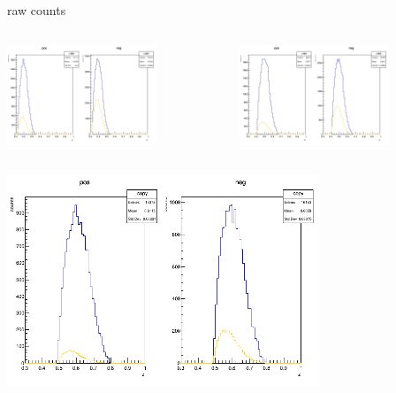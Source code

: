 \begin{frame}{raw counts}
\begin{columns}
\begin{column}[T]{0.5\textwidth}
\includegraphics[width = 0.7\textwidth]{results/yield/statistics/counts_x_Q2_z_0.65_5.500_0.40.png}
\end{column}
\begin{column}[T]{0.5\textwidth}
\includegraphics[width = 0.7\textwidth]{results/yield/statistics/counts_x_Q2_z_0.65_5.500_0.50.png}
\end{column}
\end{columns}
\begin{columns}
\begin{column}[T]{0.5\textwidth}
\includegraphics[width = 0.7\textwidth]{results/yield/statistics/counts_x_Q2_z_0.65_5.500_0.60.png}

\end{column}
\end{columns}
\end{frame}
